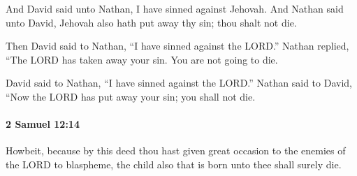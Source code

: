 			\begin{versebox}
					\item[BHS] 
					\item[ASV] And David said unto Nathan, I have sinned against Jehovah. And Nathan said unto David, Jehovah also hath put away thy sin; thou shalt not die.
					\item[NIV] Then David said to Nathan, “I have sinned against the LORD.” Nathan replied, “The LORD has taken away your sin. You are not going to die.
					\item[NRSV] David said to Nathan, “I have sinned against the LORD.” Nathan said to David, “Now the LORD has put away your sin; you shall not die.
			\end{versebox}

		\paragraph{2 Samuel 12:14} %
			\label{2SAMUEL-12-14}

			Howbeit, because by this deed thou hast given great occasion to the enemies of the LORD to blaspheme, the child also that is born unto thee shall surely die.

